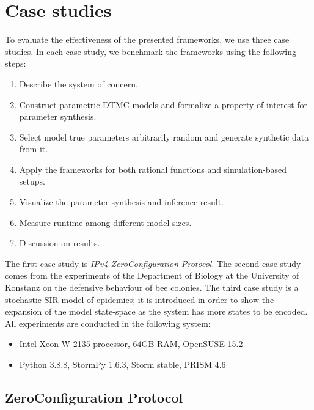 \chapter{Case studies}
To evaluate the effectiveness of the presented frameworks, we use three case studies. In each case
study, we benchmark the frameworks using the following steps:
\begin{enumerate}
    \item Describe the system of concern.
    \item Construct parametric DTMC models and formalize a property of interest for parameter synthesis.
    \item Select model true parameters arbitrarily random and generate synthetic data from it.
    \item Apply the frameworks for both rational functions and simulation-based setups.
    \item Visualize the parameter synthesis and inference result.
    \item Measure runtime among different model sizes.
    \item Discussion on results.
\end{enumerate}
The first case study is \textit{IPv4 ZeroConfiguration Protocol}. The second case study comes from
the experiments of the Department of Biology at the University of Konstanz on the defensive
behaviour of bee colonies\cite{hajnal2019data}. The third case study is a stochastic SIR model of
epidemics; it is introduced in order to show the expansion of the model state-space as the system
has more states to be encoded. All experiments are conducted in the following system:
\begin{itemize}
    \item Intel Xeon W-2135 processor, 64GB RAM, OpenSUSE 15.2
    \item Python 3.8.8, StormPy 1.6.3, Storm stable, PRISM 4.6
\end{itemize}


\section{ZeroConfiguration Protocol}
